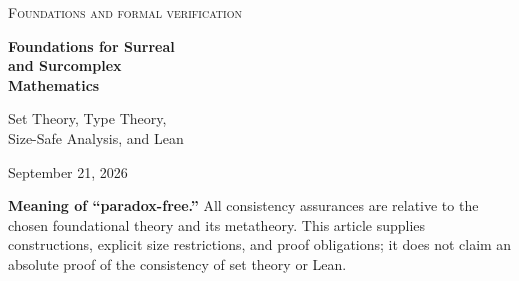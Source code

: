 \documentclass[11pt,letterpaper]{article}
\numberwithin{equation}{section}
\theoremstyle{definition}
\theoremstyle{remark}
\begin{document}
\begin{titlepage}
\centering
\vspace*{0.8cm}
{\large\scshape Foundations and formal verification\par}
\vspace{0.8cm}
{\Huge\bfseries\color{ink} Foundations for Surreal\\[0.18em] and Surcomplex\\[0.18em] Mathematics\par}
\vspace{0.8cm}
{\Large Set Theory, Type Theory,\\[0.2em] Size-Safe Analysis, and Lean\par}
\vspace{0.7cm}
{\large September 21, 2026\par}
\vspace{0.7cm}
\begin{minipage}{0.93\textwidth}
\begin{abstract}
Surreal numbers are not contradictory large real numbers. They are a precisely constructible ordered field whose totality is too large to be a set in its own ambient set universe. The real foundational danger is to erase this qualification: unrestricted cut formation, naive class quotients, proper-class supports, and universe-insensitive topology lead to false or inconsistent statements. We compare definable-class constructions in ZF and ZFC, two-sorted class theories, set-sized fragments and Hahn fields, Grothendieck universes, constructive set theories, dependent type theory, and higher inductive-inductive constructions. We distinguish the existence of the underlying field from axiomatizations that characterize its simplicity hierarchy and from additional analytic structure.

The supplied analysis and trigonometry manuscripts serve as concrete test cases. We give size-correct formulations of their workspace, summability, topology, and phase-extension principles, including a precise explanation of why small-index nets may be eventually constant while larger-index nets need not be. For Lean, we inspect a pinned contemporary combinatorial-games revision, identify its existing surreal field and small-support Hahn infrastructure, and propose a layered implementation that separates generic algebra, support-controlled analysis, and the Conway normal-form bridge. Illustrative Lean files and a source-audit record accompany the article. They are not represented as an executed formal verification.
\end{abstract}
\end{minipage}
\vfill
\begin{minipage}{0.93\textwidth}\small
\textbf{Meaning of ``paradox-free.''} All consistency assurances are relative to the chosen foundational theory and its metatheory. This article supplies constructions, explicit size restrictions, and proof obligations; it does not claim an absolute proof of the consistency of set theory or Lean.
\end{minipage}
\end{titlepage}
\begingroup\small\setlength{\parskip}{0pt}\tableofcontents\endgroup
\clearpage
\end{document}
